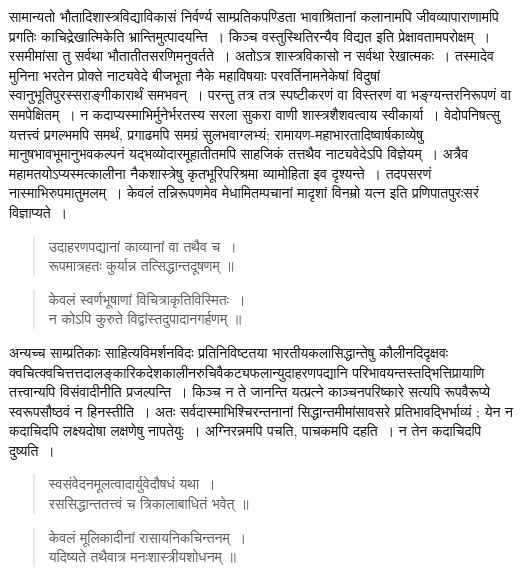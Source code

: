 {\dev सामान्यतो भौतादिशास्त्रविद्याविकासं निर्वर्ण्य साम्प्रतिकपण्डिता भावाश्रितानां कलानामपि जीवव्यापाराणामपि प्रगतिः काचिद्रेखात्मिकेति भ्रान्तिमुत्पादयन्ति~। किञ्च वस्तुस्थितिरन्यैव विद्यत इति प्रेक्षावतामपरोक्षम्~। रसमीमांसा तु सर्वथा भौतातीतसरणिमनुवर्तते~। अतोऽत्र शास्त्रविकासो न सर्वथा रेखात्मकः~। तस्मादेव मुनिना भरतेन प्रोक्ते नाट्यवेदे बीजभूता नैके महाविषयाः परवर्तिनामनेकेषां विदुषां स्वानुभूतिपुरस्सराङ्गीकारार्थं समभवन्~। परन्तु तत्र तत्र स्पष्टीकरणं वा विस्तरणं वा भङ्ग्यन्तरनिरूपणं वा समपेक्षितम्~। न कदाप्यस्माभिर्मुनेर्भरतस्य सरला सुकरा वाणी शास्त्रशैशवत्वाय स्वीकार्या~। वेदोपनिषत्सु यत्तत्त्वं प्रगल्भमपि समर्थं, प्रगाढमपि समग्रं सुलभवाग्लभ्यं; रामायण-महाभारतादिष्वार्षकाव्येषु मानुषभावभूमानुभव\-कल्पनं यद्भव्योदारमूहातीतमपि साहजिकं तत्तथैव नाट्यवेदेऽपि विज्ञेयम्~। अत्रैव महामतयोऽप्यस्मत्कालीना नैकशास्त्रेषु कृतभूरिपरिश्रमा व्यामोहिता इव दृश्यन्ते~। तदपसरणं नास्माभिरुपमातुमलम्~। केवलं तन्निरूपणमेव मेधामितम्पचानां मादृशां विनम्रो यत्न इति प्रणिपातपुरःसरं विज्ञाप्यते~।}
\begin{quote}
{\dev उदाहरणपद्यानां काव्यानां वा तथैव च~।}\\
{\dev रूपमात्रहतः कुर्यान्न तत्सिद्धान्तदूषणम् ॥}
\end{quote}
\begin{quote}
{\dev केवलं स्वर्णभूषाणां विचित्राकृतिविस्मितः~।}\\
{\dev न कोऽपि कुरुते विद्वांस्तदुपादानगर्हणम् ॥}
\end{quote}

{\dev अन्यच्च साम्प्रतिकाः साहित्यविमर्शनविदः प्रतिनिविष्टतया भारतीयकलासिद्धान्तेषु कौलीन\-दिदृक्षवः क्वचित्क्वचित्तत्तदालङ्कारिकदेशकालीनरुचिवैकट्यफलान्युदाहरणपद्यानि परिभाव\-यन्त\-स्तद्भित्तिप्रायाणि तत्त्वान्यपि विसंवादीनीति प्रजल्पन्ति~। किञ्च न ते जानन्ति यत्प्रत्ने काञ्चन\-परिष्कारे सत्यपि रूपवैरूप्ये स्वरूपसौष्ठवं न हिनस्तीति~। अतः सर्वदास्माभिश्चिरन्त\-नानां सिद्धान्तमीमांसावसरे प्रतिभावद्भिर्भाव्यं ; येन न कदाचिदपि लक्ष्यदोषा लक्षणेषु नापतेयुः~। अग्निरन्नमपि पचति, पाचकमपि दहति~। न तेन कदाचिदपि दुष्यति~।}  
\begin{quote}
{\dev स्वसंवेदनमूलत्वादार्युवेदौषधं यथा~।}\\
{\dev रससिद्धान्ततत्त्वं च त्रिकालाबाधितं भवेत् ॥}
\end{quote}
\begin{quote}
{\dev केवलं मूलिकादीनां रासायनिकचिन्तनम्~।}\\
{\dev यदिष्यते तथैवात्र मनःशास्त्रीयशोधनम् ॥}
\end{quote}

